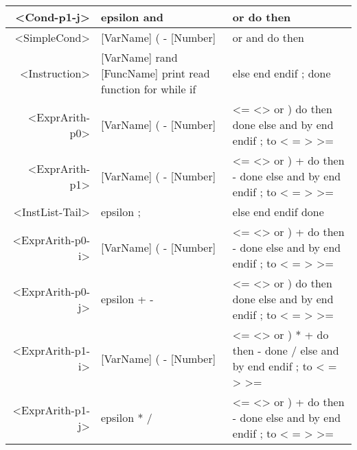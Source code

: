 \begin{longtable}{r p{7cm} p{7cm}}
<Cond-p1-j> & epsilon and  & or do then \\ \hline
<SimpleCond> & [VarName] ( - [Number]  & or and do then \\ \hline
<Instruction> & [VarName] rand [FuncName] print read function for while if  & else end endif ; done \\ \hline
<ExprArith-p0> & [VarName] ( - [Number]  & <= <> or ) do then done else and by end endif ; to < = > >= \\ \hline
<ExprArith-p1> & [VarName] ( - [Number]  & <= <> or ) + do then - done else and by end endif ; to < = > >= \\ \hline
<InstList-Tail> & epsilon ;  & else end endif done \\ \hline
<ExprArith-p0-i> & [VarName] ( - [Number]  & <= <> or ) + do then - done else and by end endif ; to < = > >= \\ \hline
<ExprArith-p0-j> & epsilon + -  & <= <> or ) do then done else and by end endif ; to < = > >= \\ \hline
<ExprArith-p1-i> & [VarName] ( - [Number]  & <= <> or ) * + do then - done / else and by end endif ; to < = > >= \\ \hline
<ExprArith-p1-j> & epsilon * /  & <= <> or ) + do then - done else and by end endif ; to < = > >= 
\end{longtable}

